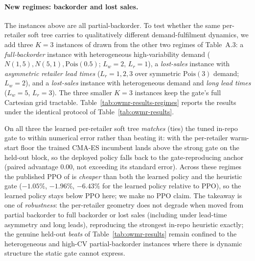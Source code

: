 \paragraph{New regimes: backorder and lost sales.}
The instances above are all partial-backorder. To test whether the same per-retailer
soft tree carries to qualitatively different demand-fulfilment dynamics, we add three
$K{=}3$ instances of \citet{kaynov2024owmr} drawn from the other two regimes of
Table~A.3: a \emph{full-backorder} instance with heterogeneous high-variability demand
($N(1,5),N(5,1),\mathrm{Pois}(0.5)$; $L_w{=}2$, $L_r{=}1$), a \emph{lost-sales} instance
with \emph{asymmetric retailer lead times} ($L_r{=}1,2,3$ over symmetric $\mathrm{Pois}(3)$
demand; $L_w{=}2$), and a \emph{lost-sales} instance with heterogeneous demand and
\emph{long lead times} ($L_w{=}5$, $L_r{=}3$). The three smaller $K{=}3$ instances keep
the gate's full Cartesian grid tractable. Table~\ref{tab:owmr-results-regimes} reports the
results under the identical protocol of Table~\ref{tab:owmr-results}.

On all three the learned per-retailer soft tree \emph{matches} (ties) the tuned in-repo
gate to within numerical error rather than beating it: with the per-retailer warm-start
floor the trained CMA-ES incumbent lands above the strong gate on the held-out block, so
the deployed policy falls back to the gate-reproducing anchor (paired advantage $0.00$, not
exceeding its standard error). Across these regimes the published PPO of
\citet{kaynov2024owmr} is \emph{cheaper} than both the learned policy and the heuristic gate
($-1.05\%$, $-1.96\%$, $-6.43\%$ for the learned policy relative to PPO), so the learned
policy stays below PPO here; we make no PPO claim. The takeaway is one of \emph{robustness}:
the per-retailer geometry does not degrade when moved from partial backorder to full
backorder or lost sales (including under lead-time asymmetry and long leads), reproducing the
strongest in-repo heuristic exactly; the genuine held-out \emph{beats} of
Table~\ref{tab:owmr-results} remain confined to the heterogeneous and high-CV
partial-backorder instances where there is dynamic structure the static gate cannot express.


